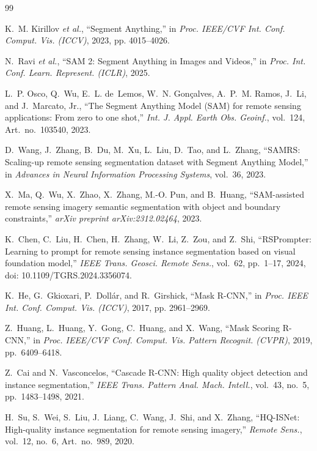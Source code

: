 \documentclass[letterpaper,journal]{IEEEtran}
\begin{document}
\begin{thebibliography}{99}


K.~M. Kirillov \textit{et al.}, ``Segment Anything,'' in \textit{Proc. IEEE/CVF Int. Conf. Comput. Vis. (ICCV)}, 2023, pp. 4015--4026.

N.~Ravi \textit{et al.}, ``SAM 2: Segment Anything in Images and Videos,'' in \textit{Proc. Int. Conf. Learn. Represent. (ICLR)}, 2025.

L.~P. Osco, Q.~Wu, E.~L. de~Lemos, W.~N. Gon\c{c}alves, A.~P.~M. Ramos, J.~Li, and J.~Marcato, Jr., ``The Segment Anything Model (SAM) for remote sensing applications: From zero to one shot,'' \textit{Int. J. Appl. Earth Obs. Geoinf.}, vol.~124, Art.~no.~103540, 2023.

D.~Wang, J.~Zhang, B.~Du, M.~Xu, L.~Liu, D.~Tao, and L.~Zhang, ``SAMRS: Scaling-up remote sensing segmentation dataset with Segment Anything Model,'' in \textit{Advances in Neural Information Processing Systems}, vol.~36, 2023.

X.~Ma, Q.~Wu, X.~Zhao, X.~Zhang, M.-O. Pun, and B.~Huang, ``SAM-assisted remote sensing imagery semantic segmentation with object and boundary constraints,'' \textit{arXiv preprint arXiv:2312.02464}, 2023.

K.~Chen, C.~Liu, H.~Chen, H.~Zhang, W.~Li, Z.~Zou, and Z.~Shi, ``RSPrompter: Learning to prompt for remote sensing instance segmentation based on visual foundation model,'' \textit{IEEE Trans. Geosci. Remote Sens.}, vol.~62, pp.~1--17, 2024, doi: 10.1109/TGRS.2024.3356074.

K.~He, G.~Gkioxari, P.~Doll\'ar, and R.~Girshick, ``Mask R-CNN,'' in \textit{Proc. IEEE Int. Conf. Comput. Vis. (ICCV)}, 2017, pp. 2961--2969.

Z.~Huang, L.~Huang, Y.~Gong, C.~Huang, and X.~Wang, ``Mask Scoring R-CNN,'' in \textit{Proc. IEEE/CVF Conf. Comput. Vis. Pattern Recognit. (CVPR)}, 2019, pp.~6409--6418.

Z.~Cai and N.~Vasconcelos, ``Cascade R-CNN: High quality object detection and instance segmentation,'' \textit{IEEE Trans. Pattern Anal. Mach. Intell.}, vol.~43, no.~5, pp.~1483--1498, 2021.

H.~Su, S.~Wei, S.~Liu, J.~Liang, C.~Wang, J.~Shi, and X.~Zhang, ``HQ-ISNet: High-quality instance segmentation for remote sensing imagery,'' \textit{Remote Sens.}, vol.~12, no.~6, Art.~no.~989, 2020.


\end{thebibliography}
\end{document}
